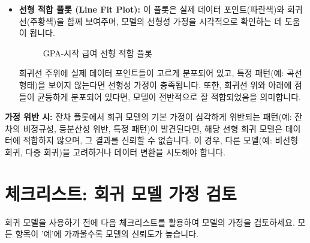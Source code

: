 \documentclass[11pt,a4paper]{article}
\theoremstyle{definition}
\begin{document}
\begin{itemize}
    \item \textbf{선형 적합 플롯 (Line Fit Plot):}
    이 플롯은 실제 데이터 포인트(파란색)와 회귀선(주황색)을 함께 보여주며, 모델의 선형성 가정을 시각적으로 확인하는 데 도움이 됩니다.
    \begin{figure}[h!]
        \centering
        \caption{GPA-시작 급여 선형 적합 플롯}
        \label{fig:gpa_salary_line_fit_plot}
    \end{figure}
    \begin{tcolorbox}[colback=lightblue,colframe=darkblue,title={선형성 가정 확인}]
    회귀선 주위에 실제 데이터 포인트들이 고르게 분포되어 있고, 특정 패턴(예: 곡선 형태)을 보이지 않는다면 선형성 가정이 충족됩니다. 또한, 회귀선 위와 아래에 점들이 균등하게 분포되어 있다면, 모델이 전반적으로 잘 적합되었음을 의미합니다.
    \end{tcolorbox}
\end{itemize}

\begin{cautionbox}
\textbf{가정 위반 시:}
잔차 플롯에서 회귀 모델의 기본 가정이 심각하게 위반되는 패턴(예: 잔차의 비정규성, 등분산성 위반, 특정 패턴)이 발견된다면, 해당 선형 회귀 모델은 데이터에 적합하지 않으며, 그 결과를 신뢰할 수 없습니다. 이 경우, 다른 모델(예: 비선형 회귀, 다중 회귀)을 고려하거나 데이터 변환을 시도해야 합니다.
\end{cautionbox}

\newpage
\section{체크리스트: 회귀 모델 가정 검토}
회귀 모델을 사용하기 전에 다음 체크리스트를 활용하여 모델의 가정을 검토하세요. 모든 항목이 '예'에 가까울수록 모델의 신뢰도가 높습니다.
\end{document}
